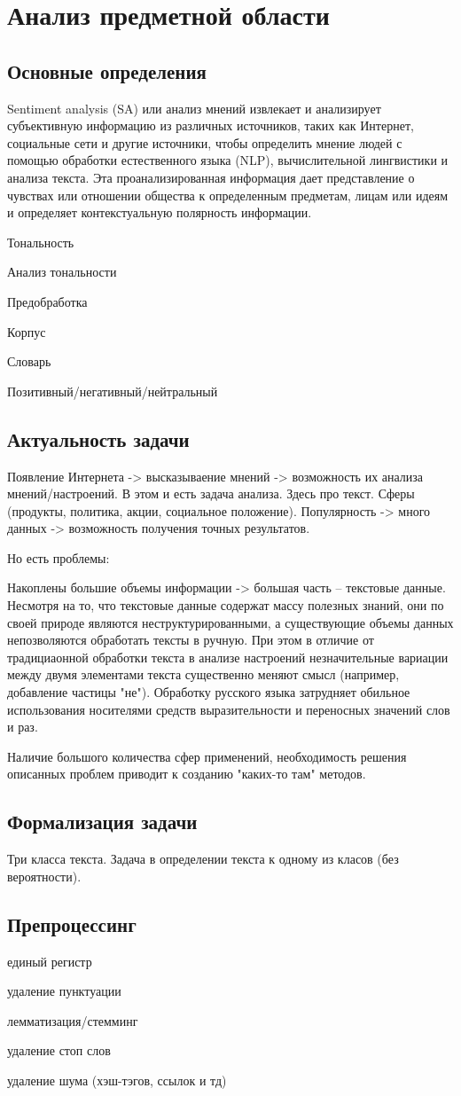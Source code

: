 \chapter{Анализ предметной области}

\section{Основные определения}

Sentiment analysis (SA) или анализ мнений извлекает и анализирует субъективную
информацию из различных источников, таких как Интернет, социальные сети и другие
источники, чтобы определить мнение людей с помощью обработки естественного языка
(NLP), вычислительной лингвистики и анализа текста.  Эта проанализированная
информация дает представление о чувствах или отношении общества к определенным
предметам, лицам или идеям и определяет контекстуальную полярность информации.
\cite{article2}


Тональность

Анализ тональности

Предобработка

Корпус

Словарь

Позитивный/негативный/нейтральный

\section{Актуальность задачи}

Появление Интернета -> высказываение мнений -> возможность их анализа
мнений/настроений. В этом и есть задача анализа. Здесь про текст. Сферы (продукты,
политика, акции, социальное положение). Популярность -> много данных ->
возможность получения точных результатов.

Но есть проблемы:

Накоплены большие объемы информации -> большая часть -- текстовые данные.
Несмотря на то, что текстовые данные содержат массу полезных знаний, они  по своей природе являются
неструктурированными, а существующие объемы данных непозволяются обработать
тексты в ручную. При этом в отличие от традициаонной обработки текста в
анализе настроений незначительные вариации между двумя элементами текста
существенно меняют смысл (например, добавление частицы "не").
Обработку русского языка затрудняет обильное использования носителями средств
выразительности и переносных значений слов и раз.

Наличие большого количества сфер применений, необходимость решения описанных
проблем приводит к созданию "каких-то там" методов.

\section{Формализация задачи}

Три класса текста. Задача в определении текста к одному из класов (без
вероятности).

\section{Препроцессинг}

единый регистр

удаление пунктуации

лемматизация/стемминг

удаление стоп слов

удаление шума (хэш-тэгов, ссылок и тд)

